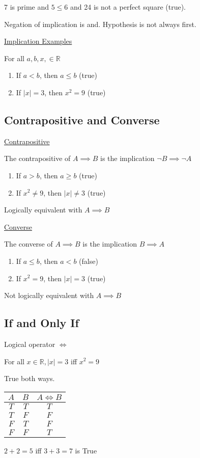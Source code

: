 \documentclass{article}
\begin{document}
7 is prime and $5 \le 6$ and 24 is not a perfect square (true).

Negation of implication is and. Hypothesis is not always first.

\underline{Implication Examples}

For all $a,b,x,\in \mathbb{R}$

\begin{enumerate}
    \item If $a < b$, then $a \le b$ (true)
    \item If $|x| = 3$, then $x^2 = 9$ (true)
\end{enumerate}


\subsection{Contrapositive and Converse}

\underline{Contrapositive}

The contrapositive of $A \implies B$ is the implication $\neg B \implies \neg A$

\begin{enumerate}
    \item If $a > b$, then $a \ge b$ (true)
    \item If $x^2 \ne 9$, then $|x| \ne 3$ (true)
\end{enumerate}

Logically equivalent with $A \implies B$

\underline{Converse}

The converse of $A \implies B$ is the implication $B \implies A$

\begin{enumerate}
    \item If $a \le b$, then $a < b$ (false)
    \item If $x^2=9$, then $|x| = 3$ (true)
\end{enumerate}

Not logically equivalent with $A \implies B$


\subsection{If and Only If}

Logical operator $\iff$

For all $x \in \mathbb{R}, |x| = 3$ iff $x^2 = 9$

True both ways. 

\begin{table}[!h]
    \centering
    \begin{tabular}{|c|c|c|} \hline 
         $A$ & $B$ & $A \iff B$\\ \hline 
         $T$& $T$ & $T$\\ \hline 
         $T$& $F$ & $F$\\ \hline 
         $F$& $T$ & $F$\\ \hline 
         $F$& $F$ & $T$\\ \hline
    \end{tabular}
\end{table}
$2+2 = 5$ iff $3 + 3 = 7$ is True
\end{document}
